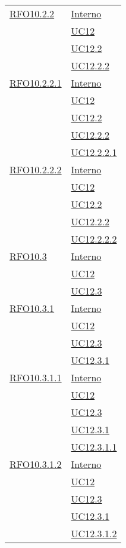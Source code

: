 \begin{longtable}{|>{\centering}m{5cm}|m{5cm}<{\centering}|}
 \hyperlink{RFO10.2.2}{RFO10.2.2} 
 & \hyperlink{Interno}{Interno}\\
& \hyperref[UC12]{UC12}\\
& \hyperref[UC12.2]{UC12.2}\\
& \hyperref[UC12.2.2]{UC12.2.2}\\\hline

 \hyperlink{RFO10.2.2.1}{RFO10.2.2.1} 
 & \hyperlink{Interno}{Interno}\\
& \hyperref[UC12]{UC12}\\
& \hyperref[UC12.2]{UC12.2}\\
& \hyperref[UC12.2.2]{UC12.2.2}\\
& \hyperref[UC12.2.2.1]{UC12.2.2.1}\\\hline

 \hyperlink{RFO10.2.2.2}{RFO10.2.2.2} 
 & \hyperlink{Interno}{Interno}\\
& \hyperref[UC12]{UC12}\\
& \hyperref[UC12.2]{UC12.2}\\
& \hyperref[UC12.2.2]{UC12.2.2}\\
& \hyperref[UC12.2.2.2]{UC12.2.2.2}\\\hline

 \hyperlink{RFO10.3}{RFO10.3} 
& \hyperlink{Interno}{Interno}\\
& \hyperref[UC12]{UC12}\\
& \hyperref[UC12.3]{UC12.3}\\\hline

 \hyperlink{RFO10.3.1}{RFO10.3.1} 
& \hyperlink{Interno}{Interno}\\
& \hyperref[UC12]{UC12}\\
& \hyperref[UC12.3]{UC12.3}\\
& \hyperref[UC12.3.1]{UC12.3.1}\\\hline

 \hyperlink{RFO10.3.1.1}{RFO10.3.1.1} 
& \hyperlink{Interno}{Interno}\\
& \hyperref[UC12]{UC12}\\
& \hyperref[UC12.3]{UC12.3}\\
& \hyperref[UC12.3.1]{UC12.3.1}\\
& \hyperref[UC12.3.1.1]{UC12.3.1.1}\\\hline

 \hyperlink{RFO10.3.1.2}{RFO10.3.1.2} 
& \hyperlink{Interno}{Interno}\\
& \hyperref[UC12]{UC12}\\
& \hyperref[UC12.3]{UC12.3}\\
& \hyperref[UC12.3.1]{UC12.3.1}\\
& \hyperref[UC12.3.1.2]{UC12.3.1.2}\\\hline


\end{longtable}
